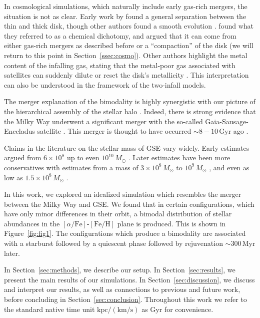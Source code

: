 \documentclass[linenumbers, twocolumn]{aastex631}
\newcommand{\Msun}{\ensuremath{M_{\odot}}}
\newcommand{\Gyr}{\ensuremath{\textrm{Gyr}}}
\newcommand{\Myr}{\ensuremath{\textrm{Myr}}}
\newcommand{\kpc}{\ensuremath{\textrm{kpc}}}
\newcommand{\kms}{\ensuremath{\textrm{km}/\textrm{s}}}
\newcommand{\FeH}{\ensuremath{[\textrm{Fe}/\textrm{H}]}}
\newcommand{\alphaFe}{\ensuremath{[\alpha/\textrm{Fe}]}}
\begin{document}
In cosmological simulations, which naturally include early gas-rich mergers, the situation is not as clear. Early work by \citet{2012MNRAS.426..690B} found a general separation between the thin and thick disk, though other authors found a smooth evolution \citep{2013A&A...558A...9M}. \citet{2018MNRAS.474.3629G} found what they referred to as a chemical dichotomy, and argued that it can come from either gas-rich mergers as described before or a ``compaction'' of the disk (we will return to this point in Section~\ref{ssec:cosmo}). Other authors highlight the metal content of the infalling gas, stating that the metal-poor gas associated with satellites can suddenly dilute or reset the disk's metallicity \citep{2020MNRAS.491.5435B,2024MNRAS.528L.122C}. This interpretation can also be understood in the framework of the two-infall models.

The merger explanation of the bimodality is highly synergistic with our picture of the hierarchical assembly of the stellar halo \citep{2005ApJ...635..931B}. Indeed, there is strong evidence that the Milky Way underwent a significant merger with the so-called Gaia-Sausage-Enceladus satellite \citep[GSE;][]{2018MNRAS.478..611B,2018Natur.563...85H,2020ApJ...901...48N}. This merger is thought to have occurred $\sim8-10\,\Gyr$ ago \citep[see also][]{2020ApJ...897L..18B}.

Claims in the literature on the stellar mass of GSE vary widely. Early estimates argued from $6\times10^8$ up to even $10^{10}\,\Msun$ \citep{2018MNRAS.478..611B,2018Natur.563...85H,2019MNRAS.484.4471F,2019MNRAS.487L..47V,2019MNRAS.488.1235M,2020MNRAS.493.5195D,2020MNRAS.497..109F}. Later estimates have been more conservatives with estimates from a mass of $3\times10^8\,\Msun$ to $10^9\,\Msun$ \citep{2019MNRAS.482.3426M,2020MNRAS.492.3631M,2021ApJ...923...92N,2022AJ....164..249H}, and even as low as $1.5\times10^8\,\Msun$ \citep{2023MNRAS.526.1209L}.

In this work, we explored an idealized simulation which resembles the merger between the Milky Way and GSE. We found that in certain configurations, which have only minor differences in their orbit, a bimodal distribution of stellar abundances in the \alphaFe{}-\FeH{} plane is produced. This is shown in Figure~\ref{fig:fig1}. The configurations which produce a bimodality are associated with a starburst followed by a quiescent phase followed by rejuvenation $\sim300\,\Myr$ later.

In Section~\ref{sec:methods}, we describe our setup. In Section~\ref{sec:results}, we present the main results of our simulations. In Section~\ref{sec:discussion}, we discuss and interpret our results, as well as connections to previous and future work, before concluding in Section~\ref{sec:conclusion}. Throughout this work we refer to the standard native time unit $\kpc/\left(\kms\right)$ as \Gyr{} for convenience.
\end{document}
